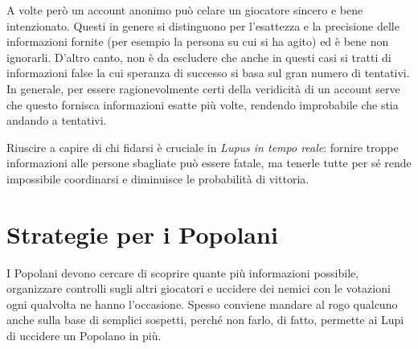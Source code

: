 \documentclass[a4paper,10pt]{article}
\begin{document}
A volte però un account anonimo può celare un giocatore sincero e bene intenzionato. Questi in genere si distinguono per l'esattezza e la precisione delle informazioni fornite (per esempio la persona su cui si ha agito) ed è bene non ignorarli. D'altro canto, non è da escludere che anche in questi casi si tratti di informazioni false la cui speranza di successo si basa sul gran numero di tentativi. In generale, per essere ragionevolmente certi della veridicità di un account serve che questo fornisca informazioni esatte più volte, rendendo improbabile che stia andando a tentativi.

Riuscire a capire di chi fidarsi è cruciale in \emph{Lupus in tempo reale}: fornire troppe informazioni alle persone sbagliate può essere fatale, ma tenerle tutte per sé rende impossibile coordinarsi e diminuisce le probabilità di vittoria.


\section{Strategie per i Popolani}

I Popolani devono cercare di scoprire quante più informazioni possibile, organizzare controlli sugli altri giocatori e uccidere dei nemici con le votazioni ogni qualvolta ne hanno l'occasione. Spesso conviene mandare al rogo qualcuno anche sulla base di semplici sospetti, perché non farlo, di fatto, permette ai Lupi di uccidere un Popolano in più.
\end{document}

